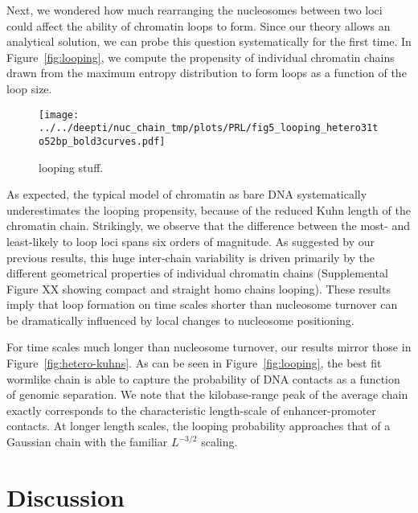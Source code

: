 \documentclass[%
 reprint,
superscriptaddress,
showpacs,preprintnumbers,
 amsmath,amssymb,
 aps,
 prl,
]{revtex4-1}
\begin{document}
Next, we wondered how much rearranging the nucleosomes between two
    loci could affect the ability of chromatin loops to form.
Since our theory allows an analytical solution, we can probe this question
    systematically for the first time.
In Figure~\ref{fig:looping}, we compute the propensity of individual chromatin
    chains drawn from the maximum entropy distribution to form loops as a
    function of the loop size.

\begin{figure}
    \centering
    \texttt{[image: ../../deepti/nuc\_chain\_tmp/plots/PRL/fig5\_looping\_hetero31to52bp\_bold3curves.pdf]}
    \caption{looping stuff.}
\end{figure}

As expected, the typical model of chromatin as bare DNA systematically
    underestimates the looping propensity, because of the reduced Kuhn length of
    the chromatin chain.
Strikingly, we observe that the difference between the most- and least-likely to
    loop loci spans six orders of magnitude.
As suggested by our previous results, this huge inter-chain variability is
    driven primarily by the different geometrical properties of individual
    chromatin chains (Supplemental Figure XX showing compact and straight homo chains
    looping).
These results imply that loop formation on time scales shorter than nucleosome
    turnover can be dramatically influenced by local changes to nucleosome
    positioning.

For time scales much longer than nucleosome turnover, our results mirror those
    in Figure~\ref{fig:hetero-kuhns}.
As can be seen in Figure~\ref{fig:looping}, the best fit wormlike chain is able
    to capture the probability of DNA contacts as a function of genomic separation.
We note that the kilobase-range peak of the average chain exactly corresponds to
    the characteristic length-scale of enhancer-promoter contacts.
At longer length scales, the looping probability approaches that of a Gaussian
    chain with the familiar $L^{-3/2}$ scaling.

\section{\label{sec:discussion}Discussion}
\end{document}
